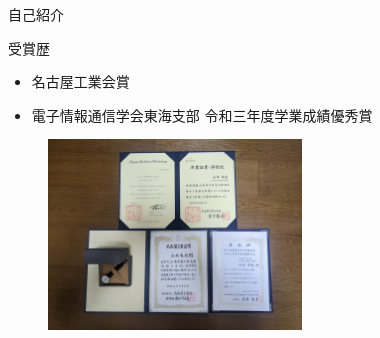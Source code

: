 \documentclass[12pt, unicode]{beamer}
\begin{document}
\begin{frame}{自己紹介}
  \begin{block}{受賞歴}
    \begin{itemize}
      \item 名古屋工業会賞
      \item 電子情報通信学会東海支部 令和三年度学業成績優秀賞
    \end{itemize}
  \end{block}

  \begin{figure}[h]
    \centering
    \includegraphics[width=0.6\textwidth]{pictures/Awards.jpg}
  \end{figure}
\end{frame}
\end{document}
